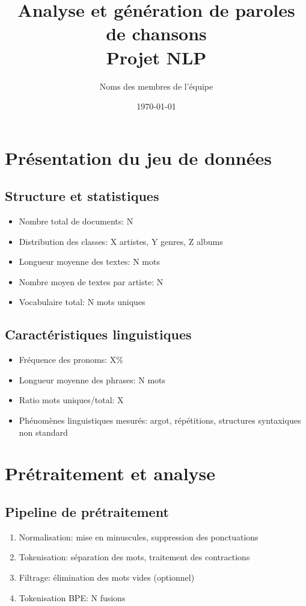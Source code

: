 \documentclass[a4paper,11pt]{article}
\title{\textbf{Analyse et génération de paroles de chansons\\
Projet NLP}}
\author{Noms des membres de l'équipe}
\date{\today}
\begin{document}
\maketitle

\section{Présentation du jeu de données}
\label{sec:dataset}

\subsection{Structure et statistiques}
\begin{itemize}
    \item Nombre total de documents: N
    \item Distribution des classes: X artistes, Y genres, Z albums
    \item Longueur moyenne des textes: N mots
    \item Nombre moyen de textes par artiste: N
    \item Vocabulaire total: N mots uniques
\end{itemize}

\subsection{Caractéristiques linguistiques}
\begin{itemize}
    \item Fréquence des pronoms: X\%
    \item Longueur moyenne des phrases: N mots
    \item Ratio mots uniques/total: X
    \item Phénomènes linguistiques mesurés: argot, répétitions, structures syntaxiques non standard
\end{itemize}

\section{Prétraitement et analyse}
\label{sec:preprocessing}

\subsection{Pipeline de prétraitement}
\begin{enumerate}
    \item Normalisation: mise en minuscules, suppression des ponctuations
    \item Tokenisation: séparation des mots, traitement des contractions
    \item Filtrage: élimination des mots vides (optionnel)
    \item Tokenisation BPE: N fusions
\end{enumerate}
\end{document}
